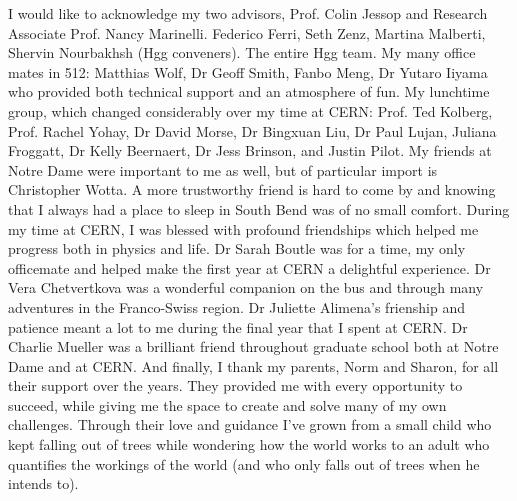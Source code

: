 \documentclass[draft,twoadvisors]{nddiss2e}
\begin{document}
\begin{acknowledge}
  I would like to acknowledge my two advisors, Prof. Colin Jessop and
  Research Associate Prof. Nancy Marinelli.  Federico Ferri, Seth
  Zenz, Martina Malberti, Shervin Nourbakhsh (Hgg conveners).  The
  entire Hgg team.  My many office mates in 512: Matthias Wolf, Dr
  Geoff Smith, Fanbo Meng, Dr Yutaro Iiyama who provided both
  technical support and an atmosphere of fun.  My lunchtime group,
  which changed considerably over my time at CERN: Prof. Ted Kolberg,
  Prof. Rachel Yohay, Dr David Morse, Dr Bingxuan Liu, Dr Paul Lujan,
  Juliana Froggatt, Dr Kelly Beernaert, Dr Jess Brinson, and Justin
  Pilot.  My friends at Notre Dame were important to me as well, but
  of particular import is Christopher Wotta.  A more trustworthy
  friend is hard to come by and knowing that I always had a place to
  sleep in South Bend was of no small comfort.  During my time at
  CERN, I was blessed with profound friendships which helped me
  progress both in physics and life.  Dr Sarah Boutle was for a time,
  my only officemate and helped make the first year at CERN a
  delightful experience.  Dr Vera Chetvertkova was a wonderful
  companion on the bus and through many adventures in the Franco-Swiss
  region.  Dr Juliette Alimena's frienship and patience meant a lot to
  me during the final year that I spent at CERN.  Dr Charlie Mueller
  was a brilliant friend throughout graduate school both at Notre Dame
  and at CERN.  And finally, I thank my parents, Norm and Sharon, for
  all their support over the years.  They provided me with every
  opportunity to succeed, while giving me the space to create and
  solve many of my own challenges.  Through their love and guidance
  I've grown from a small child who kept falling out of trees while
  wondering how the world works to an adult who quantifies the
  workings of the world (and who only falls out of trees when he
  intends to).

  \end{acknowledge}
\end{document}

